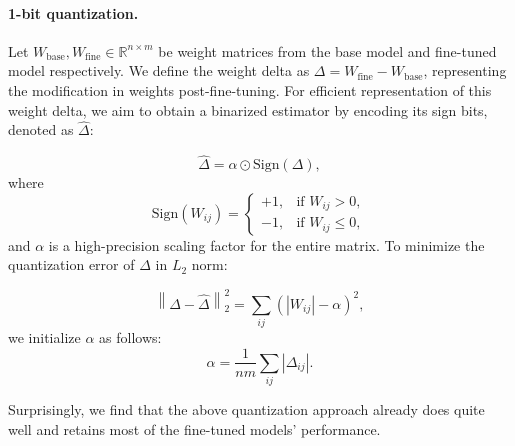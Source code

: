 \documentclass[numbers]{article}
\begin{document}
\paragraph{1-bit quantization.}  Let $W_\text{base}, W_\text{fine} \in \mathbb{R}^{n \times m}$ be weight matrices from the base model and fine-tuned model respectively. We define the weight delta as $\Delta = W_\text{fine} - W_\text{base}$, representing the modification in weights post-fine-tuning. For efficient representation of this weight delta, we aim to obtain a binarized estimator by encoding its sign bits, denoted as $\hat{\Delta}$:

\begin{equation}
    \hat{\Delta} = \alpha \odot \text{Sign}(\Delta),
\end{equation}
where
\begin{equation}
    \text{Sign}(W_{ij}) = 
    \begin{cases} 
      +1, & \text{if } W_{ij} > 0, \\
      -1, & \text{if } W_{ij} \leq 0,
    \end{cases}
\end{equation}
and $\alpha$ is a high-precision scaling factor for the entire matrix. To minimize the quantization error of $\Delta$ in $L_2$ norm:

\begin{equation}
    \left\lVert \Delta - \hat{\Delta} \right\rVert_2^2 = \sum_{ij}(|W_{ij}|- \alpha)^2,
\end{equation}
we initialize $\alpha$ as follows:
\begin{equation}
    \alpha = \frac{1}{nm} \sum_{ij} |\Delta_{ij}|.
\end{equation}

Surprisingly, we find that the above quantization approach already does quite well and retains most of the fine-tuned models' performance. 
\end{document}
